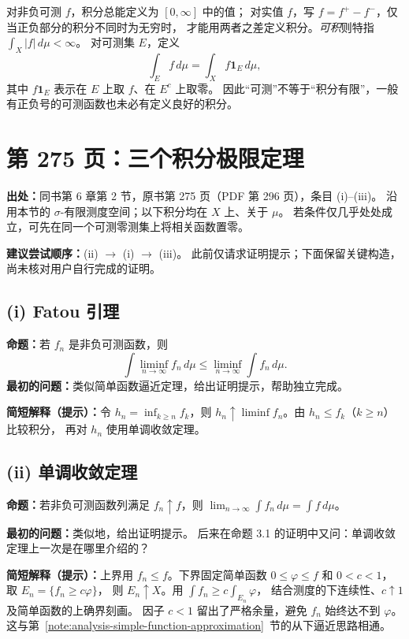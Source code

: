 \documentclass[UTF8,a4paper,11pt]{ctexart}
\begin{document}
对非负可测 $f$，积分总能定义为 $[0,\infty]$ 中的值；
对实值 $f$，写 $f=f^+-f^-$，仅当正负部分的积分不同时为无穷时，
才能用两者之差定义积分。\emph{可积}则特指 $\int_X|f|\,d\mu<\infty$。
对可测集 $E$，定义
\[
\int_E f\,d\mu=\int_X f\mathbf1_E\,d\mu,
\]
其中 $f\mathbf1_E$ 表示在 $E$ 上取 $f$、在 $E^c$ 上取零。
因此“可测”不等于“积分有限”，一般有正负号的可测函数也未必有定义良好的积分。

\newpage
\begingroup
\small
\setlength{\parskip}{0.3em}
\section{第 275 页：三个积分极限定理}
\textbf{出处：}同书第 6 章第 2 节，原书第 275 页（PDF 第 296 页），条目 (i)--(iii)。
沿用本节的 $\sigma$-有限测度空间；以下积分均在 $X$ 上、关于 $\mu$。
若条件仅几乎处处成立，可先在同一个可测零测集上将相关函数置零。

\textbf{建议尝试顺序：}(ii) $\longrightarrow$ (i) $\longrightarrow$ (iii)。
此前仅请求证明提示；下面保留关键构造，尚未核对用户自行完成的证明。

\subsection*{(i) Fatou 引理}
\label{note:stein-ch6-p275-fatou}
\textbf{命题：}若 $f_n$ 是非负可测函数，则
\[
\int \liminf_{n\to\infty} f_n\,d\mu
\leq \liminf_{n\to\infty}\int f_n\,d\mu.
\]
\textbf{最初的问题：}类似简单函数逼近定理，给出证明提示，帮助独立完成。

\textbf{简短解释（提示）：}令 $h_n=\inf_{k\geq n}f_k$，则
$h_n\uparrow\liminf f_n$。由 $h_n\leq f_k$（$k\geq n$）比较积分，
再对 $h_n$ 使用单调收敛定理。

\subsection*{(ii) 单调收敛定理}
\label{note:stein-ch6-p275-mct}
\textbf{命题：}若非负可测函数列满足 $f_n\uparrow f$，则
$\displaystyle\lim_{n\to\infty}\int f_n\,d\mu=\int f\,d\mu$。

\textbf{最初的问题：}类似地，给出证明提示。
后来在命题 3.1 的证明中又问：单调收敛定理上一次是在哪里介绍的？

\textbf{简短解释（提示）：}上界用 $f_n\leq f$。下界固定简单函数
$0\leq\varphi\leq f$ 和 $0<c<1$，取 $E_n=\{f_n\geq c\varphi\}$，
则 $E_n\uparrow X$。用 $\int f_n\geq c\int_{E_n}\varphi$，
结合测度的下连续性、$c\uparrow1$ 及简单函数的上确界刻画。
因子 $c<1$ 留出了严格余量，避免 $f_n$ 始终达不到 $\varphi$。
这与第~\ref{note:analysis-simple-function-approximation}~节的从下逼近思路相通。
\end{document}
